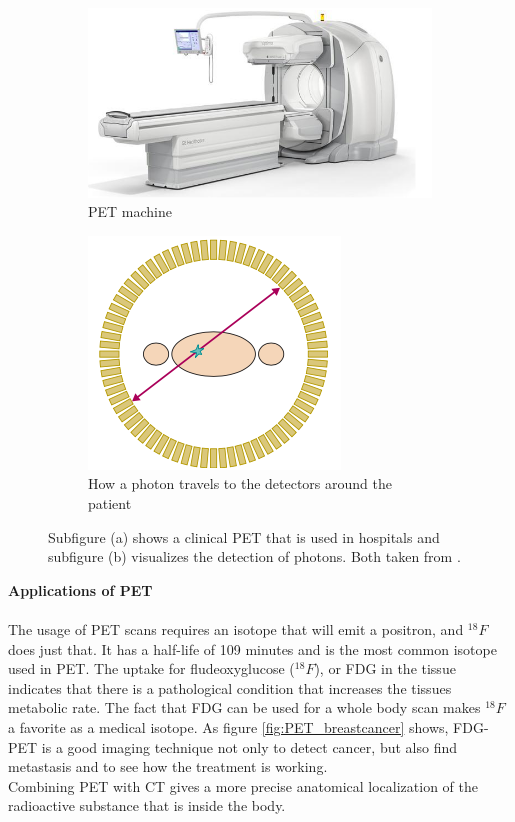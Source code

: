 \documentclass[twoside,english]{uiofysmaster/uiofysmaster}
\begin{document}
\begin{figure}[h!]
\centering
\begin{subfigure}{.5\textwidth}
  \centering
  \includegraphics[width=.7\linewidth]{petscan.png}
  \caption{PET machine}
  \label{fig:PET}
\end{subfigure}%
\begin{subfigure}{.5\textwidth}
  \centering
  \includegraphics[width=.7\linewidth]{TOF_PET.png}
  \caption{How a photon travels to the detectors around the patient}
  \label{fig:TOF_PET}
\end{subfigure}%
\caption{Subfigure (a) shows a clinical PET that is used in hospitals and subfigure (b) visualizes the detection of photons. Both taken from \cite{physics_in_medicine}.}
\label{fig:PETSCAN}
\end{figure}
\noindent
\textbf{Applications of PET}\\
\\
The usage of PET scans requires an isotope that will emit a positron, and $^{18}F$ does just that. It has a half-life of 109 minutes and is the most common isotope used in PET. The uptake for fludeoxyglucose ($^{18}F$), or FDG in the tissue indicates that there is a pathological condition that increases the tissues metabolic rate\cite{physics_in_medicine}. The fact that FDG can be used for a whole body scan makes $^{18}F$ a favorite as a medical isotope. As figure \ref{fig:PET_breastcancer} shows, FDG-PET is a good imaging technique not only to detect cancer, but also find metastasis and to see how the treatment is working.\\ Combining PET with CT gives a more precise anatomical localization of the radioactive substance that is inside the body. 
\end{document}
